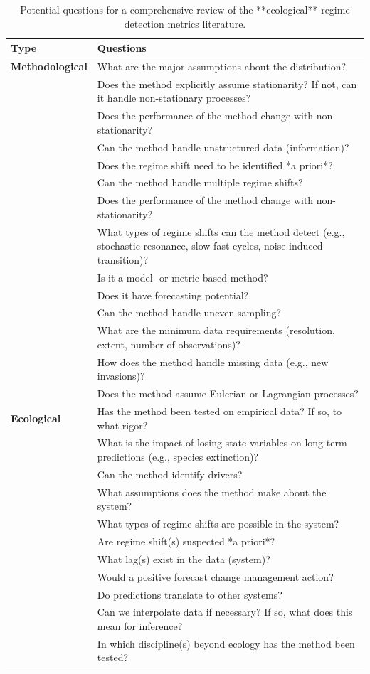 \documentclass[12pt,twoside,openany]{reedthesis}
\begin{document}
\begin{longtable}{>{\bfseries}l|>{\raggedright\arraybackslash}p{30em}}
\caption{\label{tab:nextStepsTab}Potential questions for a comprehensive review of the **ecological** regime detection metrics literature.}\\
\toprule
Type & Questions\\
\midrule
Methodological & What are the major assumptions about the distribution?\\
 & Does the method explicitly assume stationarity? If not, can it handle non-stationary processes?\\
 & Does the performance of the method change with non-stationarity?\\
 & Can the method handle unstructured data (information)?\\
 & Does the regime shift need to be identified *a priori*?\\
\addlinespace
 & Can the method handle multiple regime shifts?\\
 & Does the performance of the method change with non-stationarity?\\
 & What types of regime shifts can the method detect (e.g., stochastic resonance, slow-fast cycles, noise-induced transition)?\\
 & Is it a model- or metric-based method?\\
 & Does it have forecasting potential?\\
\addlinespace
 & Can the method handle uneven sampling?\\
 & What are the minimum data requirements (resolution, extent, number of observations)?\\
 & How does the method handle missing data (e.g., new invasions)?\\
 & Does the method assume Eulerian or Lagrangian processes?\\
Ecological & Has the method been tested on empirical data? If so, to what rigor?\\
\addlinespace
 & What is the impact of losing state variables on long-term predictions (e.g., species extinction)?\\
 & Can the method identify drivers?\\
 & What assumptions does the method make about the system?\\
 & What types of regime shifts are possible in the system?\\
 & Are regime shift(s) suspected *a priori*?\\
\addlinespace
 & What lag(s) exist in the data (system)?\\
 & Would a positive forecast change management action?\\
 & Do predictions translate to other systems?\\
 & Can we interpolate data if necessary? If so, what does this mean for inference?\\
 & In which discipline(s) beyond ecology has the method been tested?\\
\bottomrule
\end{longtable}
\end{document}
